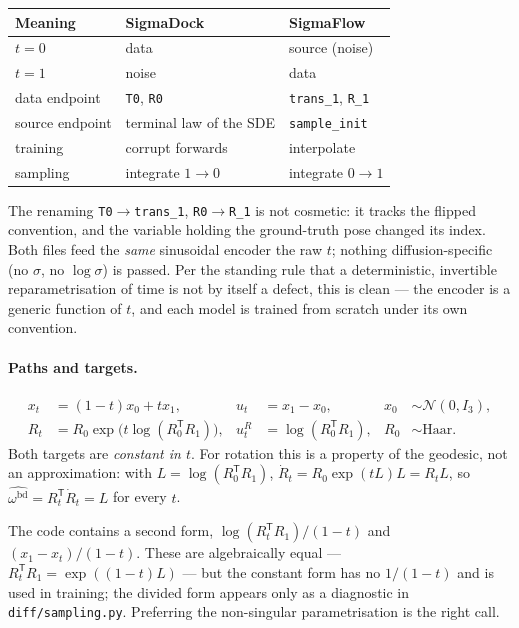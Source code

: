 \documentclass[11pt,a4paper]{report}
\theoremstyle{definition}
\theoremstyle{remark}
\newcommand{\file}[1]{\texttt{#1}}
\begin{document}
\begin{center}
\begin{tabular}{lll}
\toprule
Meaning & SigmaDock & SigmaFlow \\
\midrule
$t=0$ & data & source (noise) \\
$t=1$ & noise & data \\
data endpoint & \texttt{T0}, \texttt{R0} & \texttt{trans\_1}, \texttt{R\_1} \\
source endpoint & terminal law of the SDE & \texttt{sample\_init} \\
training & corrupt forwards & interpolate \\
sampling & integrate $1\to0$ & integrate $0\to1$ \\
\bottomrule
\end{tabular}
\end{center}

The renaming \texttt{T0}$\to$\texttt{trans\_1}, \texttt{R0}$\to$\texttt{R\_1}
is not cosmetic: it tracks the flipped convention, and the variable holding
the ground-truth pose changed its index. Both files feed the \emph{same}
sinusoidal encoder the raw $t$; nothing diffusion-specific (no $\sigma$, no
$\log\sigma$) is passed. Per the standing rule that a deterministic,
invertible reparametrisation of time is not by itself a defect, this is
clean --- the encoder is a generic function of $t$, and each model is trained
from scratch under its own convention.

\paragraph{Paths and targets.}
\begin{align}
x_t &= (1-t)x_0 + tx_1, & u_t &= x_1-x_0, & x_0&\sim\mathcal N(0,I_3), \\
R_t &= R_0\exp\!\bigl(t\log(R_0^{\mathsf T}R_1)\bigr), &
u^R_t &= \log(R_0^{\mathsf T}R_1), & R_0&\sim\text{Haar}.
\end{align}
Both targets are \emph{constant in $t$}. For rotation this is a property of
the geodesic, not an approximation: with $L=\log(R_0^{\mathsf T}R_1)$,
$\dot R_t = R_0\exp(tL)L = R_tL$, so
$\widehat{\omega^{\mathrm{bd}}} = R_t^{\mathsf T}\dot R_t = L$ for every $t$.

The code contains a second form, $\log(R_t^{\mathsf T}R_1)/(1-t)$ and
$(x_1-x_t)/(1-t)$. These are algebraically equal --- $R_t^{\mathsf T}R_1 =
\exp((1-t)L)$ --- but the constant form has no $1/(1-t)$ and is used in
training; the divided form appears only as a diagnostic in
\file{diff/sampling.py}. Preferring the non-singular parametrisation is the
right call.
\end{document}
